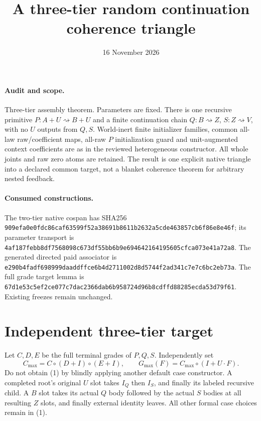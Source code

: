 \documentclass[11pt]{article}\usepackage{amsmath,amssymb,amsthm,geometry}\geometry{margin=1in}\newtheorem{theorem}{Theorem}
\title{A three-tier random continuation coherence triangle}\date{16 November 2026}
\begin{document}
\maketitle
\paragraph{Audit and scope.} Three-tier assembly theorem. Parameters are fixed. There is one recursive primitive $P:A+U\rightsquigarrow B+U$ and a finite continuation chain $Q:B\rightsquigarrow Z$, $S:Z\rightsquigarrow V$, with no $U$ outputs from $Q,S$. World-inert finite initializer families, common all-law raw/coefficient maps, all-raw $P$ initialization guard and unit-augmented context coefficients are as in the reviewed heterogeneous constructor. All whole joints and raw zero atoms are retained. The result is one explicit native triangle into a declared common target, not a blanket coherence theorem for arbitrary nested feedback.

\paragraph{Consumed constructions.} The two-tier native cospan has SHA256 \texttt{909efa0e0fdc86caf63599f52a38691b8611b2632a5cde463857cb6f86e8e46f}; its parameter transport is \texttt{4af187febb8df7568098c673df55bb6b9e694642164195605cfca073e41a72a8}. The generated directed paid associator is \texttt{e290b4fadf698999daaddffce6b4d2711002d8d5744f2ad341c7e7c6bc2eb73a}. The full grade target lemma is \texttt{67d1e53c5ef2ce077c7dac2366dab6b958724d96b8cdffd88285ecda53d79f61}. Existing freezes remain unchanged.

\section{Independent three-tier target}
Let $C,D,E$ be the full terminal grades of $P,Q,S$. Independently set
\[
 C_{\max}=C\circ(D+I)\circ(E+I),\qquad
 G_{\max}(F)=C_{\max}\circ(I+U\cdot F).              \tag{1}
\]
Do not obtain (1) by blindly applying another default case constructor. A completed root's original $U$ slot takes $I_Q$ then $I_S$, and finally its labeled recursive child. A $B$ slot takes its actual $Q$ body followed by the actual $S$ bodies at all resulting $Z$ slots, and finally external identity leaves. All other formal case choices remain in (1).
\end{document}
